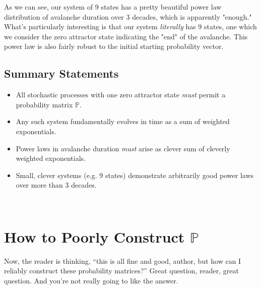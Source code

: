 \documentclass[superscriptaddress]{revtex4-1}
\newcommand{\prob}{\mathbb{P}}
\begin{document}
As we can see, our system of 9 states has a pretty beautiful power law distribution of avalanche duration over 3 decades, which is apparently "enough." What's particularly interesting is that our system \emph{literally} has 9 states, one which we consider the zero attractor state indicating the "end" of the avalanche. This power law is also fairly robust to the initial starting probability vector.





\subsection{Summary Statements}
\begin{itemize}
	\item All stochastic processes with one zero attractor state \emph{must} permit a probability matrix $\prob$.
	\item Any such system fundamentally evolves in time as a sum of weighted exponentials.
	\item Power laws in avalanche duration \emph{must} arise as clever sum of cleverly weighted exponentials.
	\item Small, clever systems (e.g. 9 states) demonstrate arbitrarily good power laws over more than 3 decades.
\end{itemize}
\newpage~\newpage







\section{How to Poorly Construct $\prob$}
Now, the reader is thinking, ``this is all fine and good, author, but how can I reliably construct these probability matrices?'' Great question, reader, great question. And you're not really going to like the answer.
\end{document}
